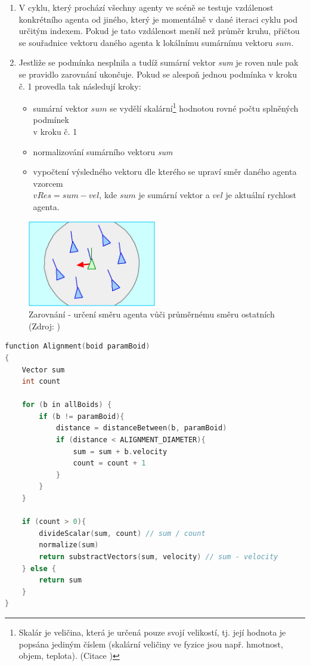 \documentclass[czech,public,dept460,male,cpdeclaration]{diploma}
\begin{document}
\begin{enumerate}
	\item V cyklu, který prochází všechny agenty ve scéně se testuje vzdálenost konkrétního agenta od jiného, který je momentálně v dané iteraci cyklu pod určitým indexem. Pokud je tato vzdálenost menší než průměr kruhu, přičtou se souřadnice vektoru daného agenta k lokálnímu sumárnímu vektoru \(sum\).
	\item Jestliže se podmínka nesplnila a tudíž sumární vektor \textit{sum} je roven nule pak se pravidlo zarovnání ukončuje. Pokud se alespoň jednou podmínka v kroku č. 1 provedla tak následují kroky:
	
	\begin{itemize}
		\item sumární vektor \(sum\) se vydělí skalární\footnote{Skalár je veličina, která je určená pouze svojí velikostí, tj. její hodnota je popsána jediným číslem (skalární veličiny ve fyzice jsou např. hmotnost, objem, teplota).
		(Citace \cite{linkToScalar})} hodnotou rovné počtu splněných podmínek \\v kroku č. 1
		\item normalizování sumárního vektoru \textit{sum}
		\item vypočtení výsledného vektoru dle kterého se upraví směr daného agenta vzorcem \\\(vRes = sum - vel\), kde \(sum\) je sumární vektor a \(vel\) je aktuální rychlost agenta.
	\end{itemize}
	
\end{enumerate}

\begin{figure}[H]\centering\includegraphics[width=0.5\textwidth]{Figures/alignment.jpg}
	\caption{Zarovnání - určení směru agenta vůči průměrnému směru ostatních (Zdroj: \cite{link2})} \label{fig:zarovnani}
\end{figure}

\begin{lstlisting}[language=C++,label=src:Alignment pseudocode,caption=Pseudokód pro zarovnání]
function Alignment(boid paramBoid)
{
	Vector sum
	int count
	
	for (b in allBoids) {
		if (b != paramBoid){
			distance = distanceBetween(b, paramBoid)
			if (distance < ALIGNMENT_DIAMETER){
				sum = sum + b.velocity
				count = count + 1
			}
		}
	}
	
	if (count > 0){
		divideScalar(sum, count) // sum / count
		normalize(sum)
		return substractVectors(sum, velocity) // sum - velocity
	} else {
		return sum
	}
}
\end{lstlisting}
\end{document}
